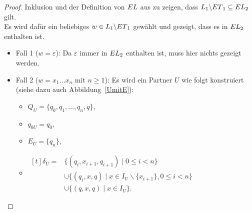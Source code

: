 \begin{proof}
  Inklusion und der Definition von $EL{}$ aus zu zeigen, dass
  $L_1\backslash ET{}_1\subseteq EL{}_2$ gilt.\\
  Es wird dafür ein beliebiges $w\in L_1\backslash ET{}_1$ gewählt und
  gezeigt, dass es in $EL{}_2$ enthalten ist.
  \begin{itemize}
    \item Fall 1 ($w=\varepsilon$): Da $\varepsilon$ immer in $EL{}_2$
      enthalten ist, muss hier nichts gezeigt werden.
    \item Fall 2 ($w=x_1\dots x_n$ mit $n\geq 1$): Es wird ein
      Partner $U$ wie folgt konstruiert (siehe dazu auch Abbildung~\ref{UmitE}):
      \begin{itemize}
        \item $Q_U=\{q_0,q_1,\dots ,q_n,q\}$,
        \item $q_{0U}=q_0$,
        \item $E_U=\{q_n\}$,
        \item $\begin{aligned}[t]
            \delta _U=&\{(q_i,x_{i+1},q_{i+1})\mid 0\leq i< n\}\\
                      &\cup\{(q_i,x,q)\mid x\in I_U\backslash\{x_{i+1}\},0\leq
          i< n\}\\
          &\cup\{(q,x,q)\mid x\in I_U\}.
              \end{aligned}$
      \end{itemize}
      \begin{figure} [h!tbp]
      \begin{center}
\end{center}
\end{figure}
\end{itemize}
\end{proof}
